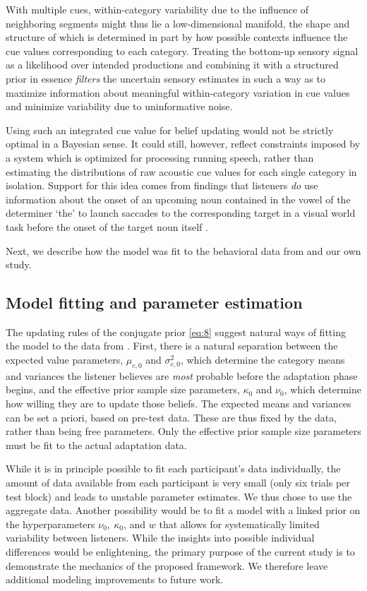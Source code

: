 With multiple cues, within-category variability due to the influence of neighboring segments might thus lie a low-dimensional manifold, the shape and structure of which is determined in part by how possible contexts influence the cue values corresponding to each category.  Treating the bottom-up sensory signal as a likelihood over intended productions \autocite[as do][]{Feldman2009a} and combining it with a structured prior in essence \emph{filters} the uncertain sensory estimates in such a way as to maximize information about meaningful within-category variation in cue values and minimize variability due to uninformative noise.

Using such an integrated cue value for belief updating would not be strictly optimal in a Bayesian sense. It could still, however, reflect constraints imposed by a system which is optimized for processing running speech, rather than estimating the distributions of raw acoustic cue values for each single category in isolation. Support for this idea comes from findings that listeners \emph{do} use information about the onset of an upcoming noun contained in the vowel of the determiner `the' to launch saccades to the corresponding target in a visual world task before the onset of the target noun itself \autocite{Salverda2014}.

Next, we describe how the model was fit to the behavioral data from \textcite{Vroomen2007} and our own study.


\subsection{Model fitting and parameter estimation}
\label{sec:model-fitt-param}

The updating rules of the conjugate prior \eqref{eq:8} suggest natural ways of fitting the model to the data from \textcite{Vroomen2007}.  First, there is a natural separation between the expected value parameters, $\mu_{c,0}$ and $\sigma^2_{c,0}$, which determine the category means and variances the listener believes are \emph{most} probable before the adaptation phase begins, and the effective prior sample size parameters, $\kappa_0$ and $\nu_0$, which determine how willing they are to update those beliefs.  The expected means and variances can be set a priori, based on pre-test data.  These are thus fixed by the data, rather than being free parameters.  Only the effective prior sample size parameters must be fit to the actual adaptation data.

While it is in principle possible to fit each participant's data individually, the amount of data available from each participant is very small (only six trials per test block) and leads to unstable parameter estimates. We thus chose to use the aggregate data.  Another possibility would be to fit a model with a linked prior on the hyperparameters $\nu_0,\ \kappa_0$, and $w$ that allows for systematically limited variability between listeners. While the insights into possible individual differences would be enlightening, the primary purpose of the current study is to demonstrate the mechanics of the proposed framework. We therefore leave additional modeling improvements to future work.


